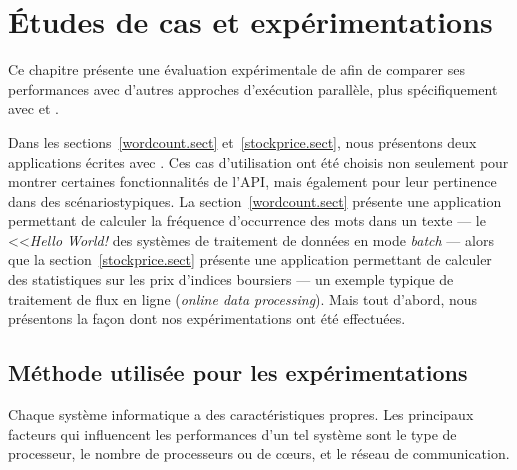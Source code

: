 
\chapter{\'Etudes de cas et exp\'erimentations}
\label{experiences.chap}


Ce chapitre pr\'esente une \'evaluation exp\'erimentale de  afin de comparer ses performances avec d'autres approches d'ex\'ecution parall\`ele, plus sp\'ecifiquement avec  et .

Dans les sections~\ref{wordcount.sect} et~\ref{stockprice.sect}, nous pr\'esentons deux applications \'ecrites avec \PpFf. Ces cas d'utilisation ont \'et\'e choisis non seulement pour montrer certaines fonctionnalit\'es de l'API, mais \'egalement pour leur pertinence dans des sc\'enariostypiques. La section~\ref{wordcount.sect} pr\'esente une application permettant de calculer la fr\'equence d'occurrence des mots dans un texte --- le <<\emph{Hello World!} des syst\`emes de traitement de donn\'ees en mode \emph{batch} --- alors que la section~\ref{stockprice.sect} pr\'esente une application permettant de calculer des statistiques sur les prix d'indices boursiers --- un exemple typique de traitement de flux en ligne (\emph{online data processing}).
%
Mais tout d'abord, nous pr\'esentons la fa\c{c}on dont nos
exp\'erimentations ont \'et\'e effectu\'ees.

\section{M\'ethode utilis\'ee pour les exp\'erimentations}
\label{usedMethodsForBenchmarks.chap}

Chaque syst\`eme informatique a des caract\'eristiques propres. Les principaux facteurs qui influencent les performances d'un tel syst\`eme sont le type de processeur, le nombre de processeurs ou de c\oe{}urs, et le r\'eseau de communication. 






